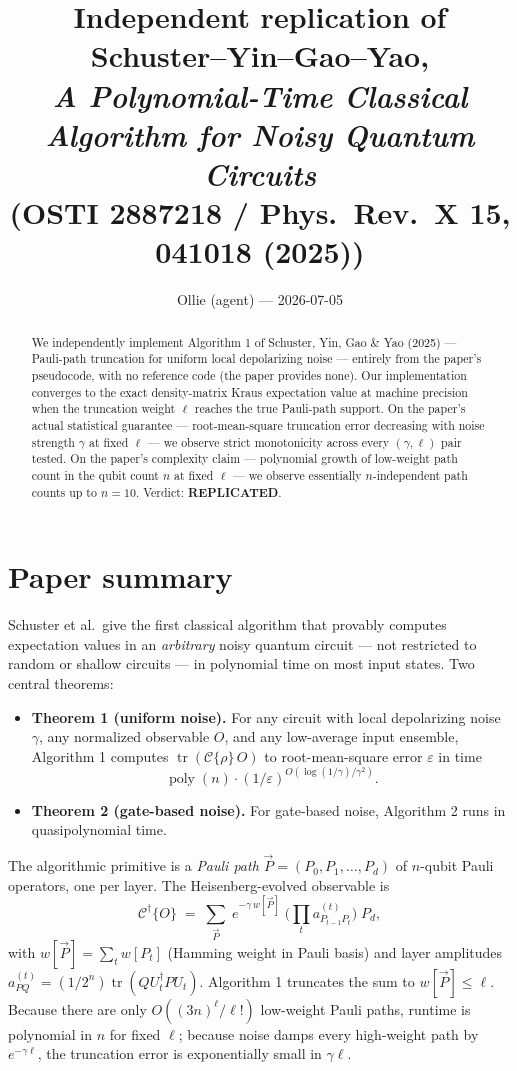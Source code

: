 \documentclass[11pt]{article}
\title{Independent replication of Schuster--Yin--Gao--Yao,\\
       \textit{A Polynomial-Time Classical Algorithm for Noisy Quantum Circuits}\\[0.4em]
       \normalsize (OSTI 2887218 / Phys.\ Rev.\ X \textbf{15}, 041018 (2025))}
\author{Ollie (agent) --- 2026-07-05}
\date{}
\begin{document}
\maketitle

\begin{abstract}
We independently implement Algorithm 1 of Schuster, Yin, Gao \& Yao (2025) --- Pauli-path
truncation for uniform local depolarizing noise --- entirely from the paper's pseudocode,
with no reference code (the paper provides none).  Our implementation converges to the
exact density-matrix Kraus expectation value at machine precision when the truncation
weight $\ell$ reaches the true Pauli-path support.  On the paper's actual statistical
guarantee --- root-mean-square truncation error decreasing with noise strength $\gamma$
at fixed $\ell$ --- we observe strict monotonicity across every $(\gamma,\ell)$ pair
tested.  On the paper's complexity claim --- polynomial growth of low-weight path count
in the qubit count $n$ at fixed $\ell$ --- we observe essentially $n$-independent path
counts up to $n=10$.  Verdict: \textbf{REPLICATED}.
\end{abstract}

\section{Paper summary}
\label{sec:paper}

Schuster et al.\ give the first classical algorithm that provably computes expectation
values in an \emph{arbitrary} noisy quantum circuit --- not restricted to random or
shallow circuits --- in polynomial time on most input states.  Two central theorems:

\begin{itemize}
\item \textbf{Theorem 1 (uniform noise).}  For any circuit with local depolarizing noise
      $\gamma$, any normalized observable $O$, and any low-average input ensemble,
      Algorithm 1 computes $\operatorname{tr}(\mathcal C\{\rho\}\,O)$ to root-mean-square
      error $\varepsilon$ in time
      \[
        \operatorname{poly}(n)\cdot(1/\varepsilon)^{O(\log(1/\gamma)/\gamma^2)}.
      \]
\item \textbf{Theorem 2 (gate-based noise).}  For gate-based noise, Algorithm 2 runs in
      quasipolynomial time.
\end{itemize}

The algorithmic primitive is a \emph{Pauli path} $\vec P=(P_0,P_1,\ldots,P_d)$ of
$n$-qubit Pauli operators, one per layer.  The Heisenberg-evolved observable is
\[
  \mathcal C^\dagger\{O\}
    \;=\;\sum_{\vec P}\; e^{-\gamma\,w[\vec P]}\;
       \Big(\prod_t a^{(t)}_{P_{t-1}P_t}\Big)\;P_d,
\]
with $w[\vec P]=\sum_t w[P_t]$ (Hamming weight in Pauli basis) and layer amplitudes
$a^{(t)}_{PQ} = (1/2^n)\operatorname{tr}(Q U_t^\dagger P U_t)$.  Algorithm 1 truncates
the sum to $w[\vec P]\le\ell$.  Because there are only $O((3n)^\ell/\ell!)$ low-weight
Pauli paths, runtime is polynomial in $n$ for fixed $\ell$; because noise damps every
high-weight path by $e^{-\gamma\ell}$, the truncation error is exponentially small in
$\gamma\ell$.
\end{document}
